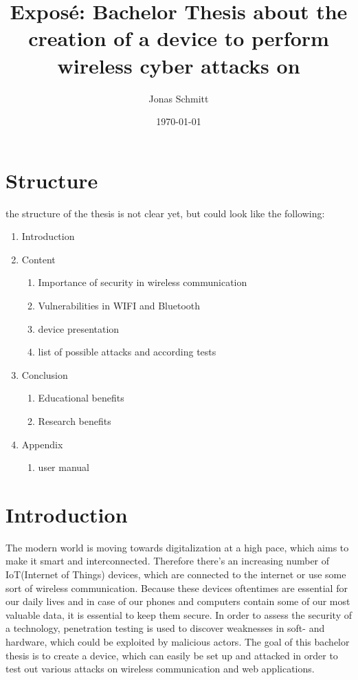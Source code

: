 \documentclass{article}
\title{Exposé: Bachelor Thesis about the creation of a device to perform wireless cyber attacks on}
\author{Jonas Schmitt}
\date{\today}
\begin{document}
\maketitle

\section{Structure}

the structure of the thesis is not clear yet, but could look like the following:

\begin{enumerate}
    \item Introduction
    \item Content
    \begin{enumerate}
        \item Importance of security in wireless communication
        \item Vulnerabilities in WIFI and Bluetooth
        \item device presentation
        \item list of possible attacks and according tests
    \end{enumerate}
    \item Conclusion
    \begin{enumerate}
        \item Educational benefits
        \item Research benefits
    \end{enumerate}
    \item Appendix
    \begin{enumerate}
        \item user manual
    \end{enumerate}
\end{enumerate}



\section{Introduction}

The modern world is moving towards digitalization at a high pace, which aims to make it smart and interconnected. Therefore there's an increasing number of IoT(Internet of Things) devices, 
which are connected to the internet or use some sort of wireless communication.
Because these devices oftentimes are essential for our daily lives and in case of our phones and computers contain some of our most valuable data, it is essential to keep them secure.
In order to assess the security of a technology, penetration testing is used to discover weaknesses in soft- and hardware, which could be exploited by malicious actors.
The goal of this bachelor thesis is to create a device, which can easily be set up and attacked in order to test out various attacks on wireless communication and web applications.  
\end{document}

